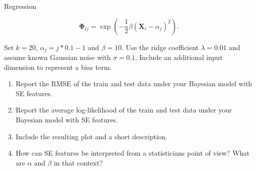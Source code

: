 \documentclass[
	english,
        solution=true
	]{tudaexercise}
\begin{document}
\begin{task}[points=34]{Regression}
\begin{subtask}[points=8, title=Squared Exponential Features]
        \begin{equation*}
            \bm{\Phi}_{ij} = \exp \left( -\frac{1}{2} \beta (\mathbf{X}_i - \alpha_j)^2 \right).
        \end{equation*}

        Set $k = 20$, $\alpha_j = j * 0.1 - 1$ and $\beta = 10$. Use the ridge coefficient $\lambda = 0.01$ and assume known Gaussian noise with $\sigma = 0.1$.
        Include an additional input dimension to represent a bias term.

        \begin{enumerate}
            \item Report the RMSE of the train and test data under your Bayesian model with SE features. 
            \item Report the average log-likelihood of the train and test data under your Bayesian model with SE features. 
            \item Include the resulting plot and a short description. 
            \item How can SE features be interpreted from a statisticians point of view? What are $\alpha$ and $\beta$ in that context? 
        \end{enumerate}

        \begin{solution}

        \end{solution}
    \end{subtask}
\end{task}

\newpage
\end{document}
